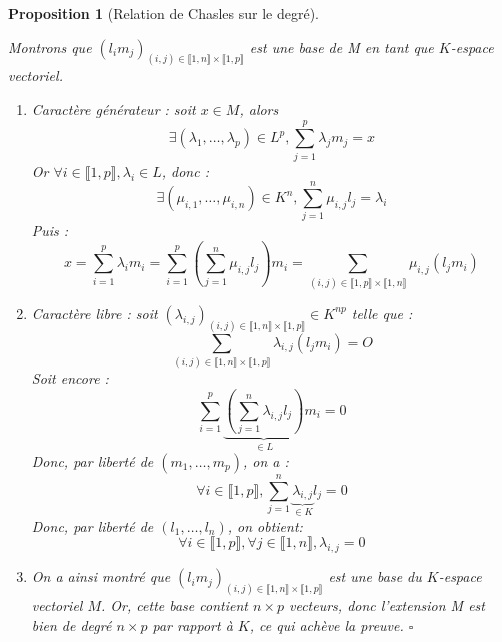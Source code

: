 \documentclass[a4paper,12pt,french]{report}
\newtheorem{proposition}{Proposition}[section]
\begin{document}
\begin{proposition}[Relation de Chasles sur le degré]
\begin{preuve}
					Montrons que \((l_i m_j)_{(i, j) \in \llbracket 1, n \rrbracket \times \llbracket 1, p \rrbracket}\) est une base de M en tant que \(K\)-espace vectoriel.
					\begin{enumerate}
					\item \emph{Caractère générateur} : soit \(x \in M\), alors 
						\[
						\exists (\lambda_1, \dots, \lambda_p) \in L^p, \sum_{j  = 1}^{p} \lambda_j m_j = x
						\]
						Or \(\forall i \in \llbracket 1, p \rrbracket, \lambda_i \in L\), donc :
						\[ 
						\exists (\mu_{i, 1}, \dots, \mu_{i, n}) \in K^n, \sum_{j  = 1}^{n} \mu_{i, j} l_j = \lambda_i 
						\]
						Puis :
						\[
						x 	= \sum_{i  = 1}^{p} \lambda_i m_i  
							= \sum_{i  = 1}^{p} \left(\sum_{j  = 1}^{n} \mu_{i, j} l_j\right) m_i 
							= \sum_{(i, j) \in \llbracket 1, p \rrbracket \times \llbracket 1, n \rrbracket}\mu_{i, j} (l_j m_i)
						\]
					\item \emph{Caractère libre} : soit \((\lambda_{i, j})_{ (i, j) \in \llbracket 1, n \rrbracket \times \llbracket 1, p \rrbracket} \in K^{np}\) telle que :
							\[
							\sum_{(i, j) \in \llbracket 1, n \rrbracket \times \llbracket 1, p \rrbracket} \lambda_{i, j} (l_j m_i) = O
							\]
						Soit encore :
							\[
							\sum_{i=1}^{p} \underbrace{\left( \sum_{j = 1}^{n} \lambda_{i, j} l_j \right)}_{\in L}m_i = 0
							\]
						Donc, par liberté de \((m_1, \dots, m_p)\), on a :
							\[
							\forall i \in \llbracket 1, p \rrbracket, \sum_{j = 1}^{n} \underbrace{\lambda_{i, j}}_{\in K} l_j = 0
							\]
						Donc, par liberté de \((l_1, \dots, l_n)\), on obtient:
							\[
							\forall i \in \llbracket 1, p \rrbracket, \forall j \in \llbracket 1, n \rrbracket, \lambda_{i, j} = 0
							\]
					\item On a ainsi montré que \((l_i m_j)_{(i, j) \in \llbracket 1, n \rrbracket \times \llbracket 1, p \rrbracket}\) est une base du \(K\)-espace vectoriel \(M\). Or, cette base contient \(n\times p\) vecteurs, donc l'extension M est bien de degré \(n\times p\) par rapport à \(K\), ce qui achève la preuve. \(\square\)
					
					\end{enumerate}
				\end{preuve}
			\end{proposition}
			
\end{document}
